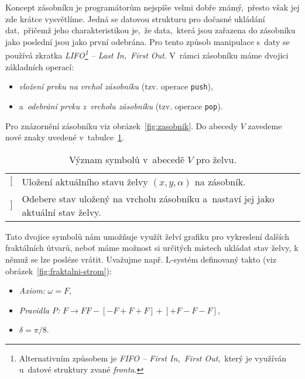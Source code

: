 Koncept zásobníku je programátorům nejspíše velmi dobře známý,~přesto však jej zde krátce vysvětlíme. Jedná se datovou strukturu pro dočasné ukládání dat,~přičemž jeho charakteristikou je,~že data,~která jsou zařazena do zásobníku jako poslední jsou jako první odebrána. Pro tento způsob manipulace s~daty se používá zkratka \emph{LIFO\footnote{Alternativním způsobem je \emph{FIFO -- First In,~First Out},~který je využíván u~datové struktury zvané \emph{fronta}.} -- Last In,~First Out}. V~rámci zásobníku máme dvojici základních operací:
\begin{itemize}
    \item \emph{vložení prvku na vrchol zásobníku} (tzv. operace \texttt{push}),~
    \item a~\emph{odebrání prvku z~vrcholu zásobníku} (tzv. operace \texttt{pop}).
\end{itemize}
Pro znázornění zásobníku viz obrázek~\ref{fig:zasobnik}. Do abecedy $V$ zavedeme nové znaky uvedené v~tabulce~\ref{table:vyznam-symbolu-zelva-zasobnik}. 
\begin{table}[H]
    \centering
    \begin{tabular}{lp{}}
        $[$ & Uložení aktuálního stavu želvy $(x,y,\alpha)$ na zásobník.\\
        $]$ & Odebere stav uložený na vrcholu zásobníku a~nastaví jej jako aktuální stav želvy.
    \end{tabular}
    \caption{Význam symbolů v~abecedě $V$ pro želvu.}
    \label{table:vyznam-symbolu-zelva-zasobnik}
\end{table}
Tato dvojice symbolů nám umožňuje využít želví grafiku pro vykreslení dalších fraktálních útvarů, neboť máme možnost si určitých místech ukládat stav želvy, k němuž se lze posléze vrátit. Uvažujme např. L-systém definovaný takto (viz obrázek~\ref{fig:fraktalni-strom}):
\begin{itemize}
    \item \emph{Axiom:} $\omega=F$,
    \item \emph{Pravidla $P$:} $F\to FF-[-F+F+F]+[+F-F-F]$,
    \item $\delta=\pi/8$.
\end{itemize}

